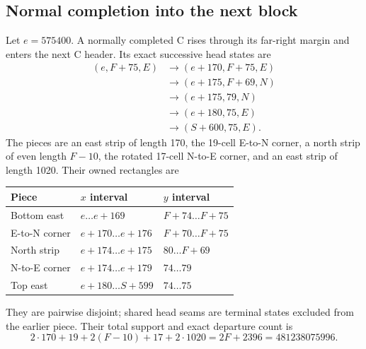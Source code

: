 \documentclass[11pt,letterpaper]{article}
\theoremstyle{definition}\newtheorem{definition}[theorem]{Definition}
\theoremstyle{remark}\newtheorem{remark}[theorem]{Remark}
\begin{document}
\subsection{Normal completion into the next block}
Let $e=575400$. A normally completed C rises through its far-right margin and enters the next C header. Its exact successive head states are
\begin{align*}
(e,F+75,E)&\longrightarrow(e+170,F+75,E)\\
&\longrightarrow(e+175,F+69,N)\\
&\longrightarrow(e+175,79,N)\\
&\longrightarrow(e+180,75,E)\\
&\longrightarrow(S+600,75,E).
\end{align*}
The pieces are an east strip of length 170, the 19-cell E-to-N corner, a north strip of even length $F-10$, the rotated 17-cell N-to-E corner, and an east strip of length 1020. Their owned rectangles are
\begin{center}
\begin{tabular}{lll}\toprule
Piece & $x$ interval & $y$ interval\\\midrule
Bottom east & $e\ldots e+169$ & $F+74\ldots F+75$\\
E-to-N corner & $e+170\ldots e+176$ & $F+70\ldots F+75$\\
North strip & $e+174\ldots e+175$ & $80\ldots F+69$\\
N-to-E corner & $e+174\ldots e+179$ & $74\ldots79$\\
Top east & $e+180\ldots S+599$ & $74\ldots75$\\\bottomrule
\end{tabular}
\end{center}
They are pairwise disjoint; shared head seams are terminal states excluded from the earlier piece. Their total support and exact departure count is
\begin{equation}\label{ptr:la:eq:channelcount}
2\cdot170+19+2(F-10)+17+2\cdot1020
=2F+2396=481238075996.
\end{equation}
\end{document}
